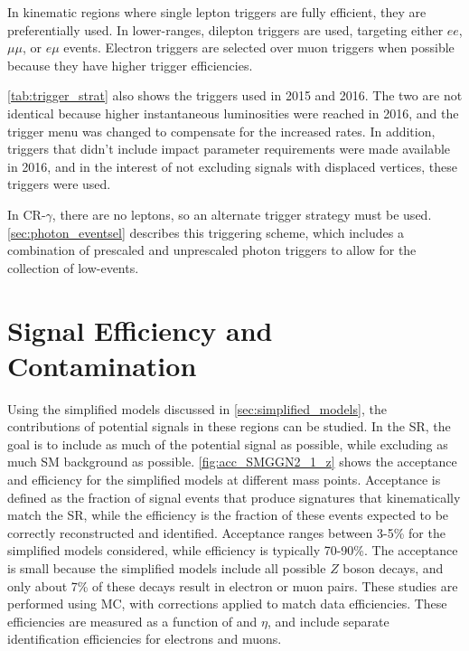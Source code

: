 In kinematic regions where single lepton triggers are fully efficient, they are preferentially used. In lower-\pt ranges, dilepton triggers are used, targeting either $ee$, $\mu\mu$, or $e\mu$ events. Electron triggers are selected over muon triggers when possible because they have higher trigger efficiencies.

\autoref{tab:trigger_strat} also shows the triggers used in 2015 and 2016. The two are not identical because higher instantaneous luminosities were reached in 2016, and the trigger menu was changed to compensate for the increased rates. In addition, triggers that didn't include impact parameter requirements were made available in 2016, and in the interest of not excluding signals with displaced vertices, these triggers were used.

In CR-$\gamma$, there are no leptons, so an alternate trigger strategy must be used. \autoref{sec:photon_eventsel} describes this triggering scheme, which includes a combination of prescaled and unprescaled photon triggers to allow for the collection of low-\pt \gjets events. 


\section{Signal Efficiency and Contamination}

Using the simplified models discussed in \autoref{sec:simplified_models}, the contributions of potential signals in these regions can be studied. In the \ac{SR}, the goal is to include as much of the potential signal as possible, while excluding as much \ac{SM} background as possible. \autoref{fig:acc_SMGGN2_1_z} shows the acceptance and efficiency for the simplified models at different mass points. Acceptance is defined as the fraction of signal events that produce signatures that kinematically match the \ac{SR}, while the efficiency is the fraction of these events expected to be correctly reconstructed and identified. Acceptance ranges between 3-5\% for the simplified models considered, while efficiency is typically 70-90\%. The acceptance is small because the simplified models include all possible $Z$ boson decays, and only about 7\% of these decays result in electron or muon pairs. These studies are performed using \ac{MC}, with corrections applied to match data efficiencies. These efficiencies are measured as a function of \pt and $\eta$, and include separate identification efficiencies for electrons and muons. 

